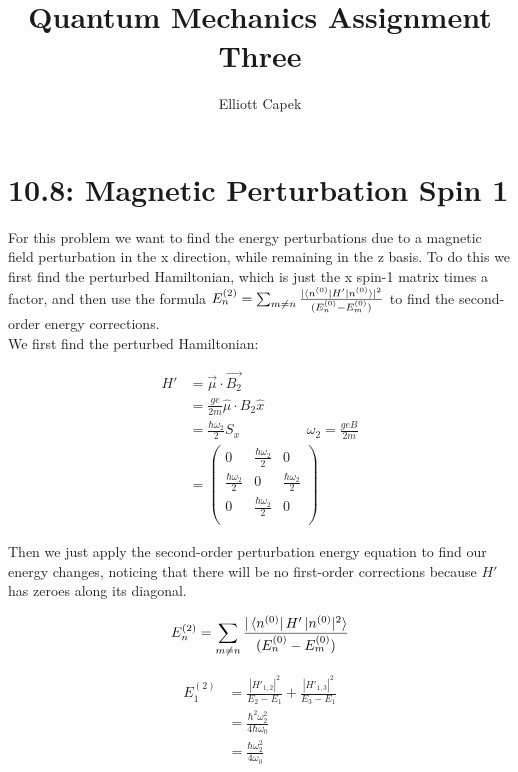 \documentclass[10pt]{article} %
\title{Quantum Mechanics Assignment Three}
\author{Elliott Capek}
\begin{document}
\maketitle{}

\section{10.8: Magnetic Perturbation Spin 1}
For this problem we want to find the energy perturbations due to a magnetic field perturbation
in the x direction, while remaining in the z basis. To do this we first find the
perturbed Hamiltonian, which is just the x spin-1 matrix times a factor, and
then use the formula
$E_n^{(2)} = \sum_{m\neq n}\frac{|\bra{n^{(0)}}H'\ket{n^{(0)}}|^2}{(E_n^{(0)}-E_m^{(0)})}$
to find the second-order energy corrections.\\

We first find the perturbed Hamiltonian:

\begin{align*}
  H' &= \vec{\mu} \cdot \vec{B_2}\\
  &= \frac{g e}{2m} \hat{\mu} \cdot B_2 \hat{x}\\
  &= \frac{\hbar\omega_2}{2} S_x
  \hspace{2cm}\omega_2 = \frac{geB}{2m}\\
  &=
  \begin{pmatrix}
    0 & \frac{\hbar\omega_2}{2} & 0\\
    \frac{\hbar\omega_2}{2} & 0 & \frac{\hbar\omega_2}{2}\\
    0 & \frac{\hbar\omega_2}{2} & 0\\
  \end{pmatrix}
\end{align*}

Then we just apply the second-order perturbation energy equation to find our
energy changes, noticing that there will be no first-order corrections because
$H'$ has zeroes along its diagonal.

\begin{align*}
  E_n^{(2)} = \sum_{m\neq n}\frac{|\bra{n^{(0)}}H'\ket{n^{(0)}|^2}}{(E_n^{(0)}-E_m^{(0)})}
\end{align*}

\begin{align*}
  E_1^{(2)} &=
  \frac{|H'_{1,2}|^2}{E_2 - E_1} +
  \frac{|H'_{1,3}|^2}{E_{3} - E_{1}}\\
  &= \frac{\hbar^2\omega_2^2}{4\hbar\omega_0}\\
  &= \frac{\hbar\omega_2^2}{4\omega_0}\\
\end{align*}
\end{document}
